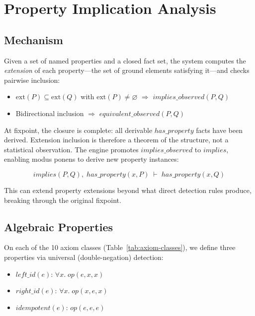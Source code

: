 \section{Property Implication Analysis}
\label{sec:property}

\subsection{Mechanism}

Given a set of named properties and a closed fact set, the system computes the \emph{extension} of each property---the set of ground elements satisfying it---and checks pairwise inclusion:

\begin{itemize}
\item $\mathrm{ext}(P) \subseteq \mathrm{ext}(Q)$ with $\mathrm{ext}(P) \neq \varnothing$ $\Rightarrow$ $\mathit{implies\_observed}(P, Q)$
\item Bidirectional inclusion $\Rightarrow$ $\mathit{equivalent\_observed}(P, Q)$
\end{itemize}

At fixpoint, the closure is complete: all derivable $\mathit{has\_property}$ facts have been derived. Extension inclusion is therefore a theorem of the structure, not a statistical observation. The engine promotes $\mathit{implies\_observed}$ to $\mathit{implies}$, enabling modus ponens to derive new property instances:

\[
\mathit{implies}(P, Q),\;\mathit{has\_property}(x, P) \;\vdash\; \mathit{has\_property}(x, Q)
\]

This can extend property extensions beyond what direct detection rules produce, breaking through the original fixpoint.

\subsection{Algebraic Properties}

On each of the 10 axiom classes (Table~\ref{tab:axiom-classes}), we define three properties via universal (double-negation) detection:

\begin{itemize}
\item $\mathit{left\_id}(e)$: $\forall x.\; \mathit{op}(e, x, x)$
\item $\mathit{right\_id}(e)$: $\forall x.\; \mathit{op}(x, e, x)$
\item $\mathit{idempotent}(e)$: $\mathit{op}(e, e, e)$
\end{itemize}

